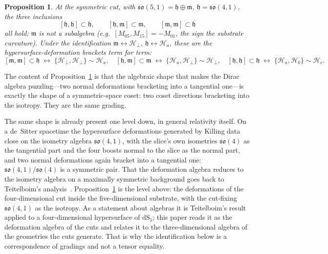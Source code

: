 \documentclass[11pt,a4paper]{article}
\theoremstyle{plain}
\newtheorem{proposition}{Proposition}
\theoremstyle{definition}
\theoremstyle{remark}
\newcommand{\so}{\mathfrak{so}}
\newcommand{\fh}{\mathfrak{h}}
\newcommand{\fm}{\mathfrak{m}}
\newcommand{\Hc}{\mathcal{H}}
\newcommand{\dS}{\mathrm{dS}}
\begin{document}
\begin{proposition}\label{prop:closure}
At the symmetric cut, with $\so(5,1)=\fh\oplus\fm$, $\fh=\so(4,1)$, the three inclusions
\[
[\fh,\fh]\subset\fh,\qquad [\fh,\fm]\subset\fm,\qquad [\fm,\fm]\subset\fh
\]
all hold; $\fm$ is not a subalgebra (e.g.\ $[M_{05},M_{15}]=-M_{01}$, the sign the substrate curvature). Under the identification $\fm\leftrightarrow\Hc_\perp$, $\fh\leftrightarrow\Hc_a$, these are the hypersurface-deformation brackets term for term:
\[
[\fm,\fm]\subset\fh \;\leftrightarrow\; \{\Hc_\perp,\Hc_\perp\}\sim\Hc_a,\quad
[\fh,\fm]\subset\fm \;\leftrightarrow\; \{\Hc_a,\Hc_\perp\}\sim\Hc_\perp,\quad
[\fh,\fh]\subset\fh \;\leftrightarrow\; \{\Hc_a,\Hc_b\}\sim\Hc_c.
\]
\end{proposition}

\noindent The content of Proposition~\ref{prop:closure} is that the algebraic shape that makes the Dirac algebra puzzling---two normal deformations bracketing into a tangential one---is exactly the shape of a symmetric-space coset: two coset directions bracketing into the isotropy. They are the same grading.

The same shape is already present one level down, in general relativity itself. On a de~Sitter spacetime the hypersurface deformations generated by Killing data close on the isometry algebra $\so(4,1)$, with the slice's own isometries $\so(4)$ as the tangential part and the four boosts normal to the slice as the normal part, and two normal deformations again bracket into a tangential one: $\so(4,1)/\so(4)$ is a symmetric pair. That the deformation algebra reduces to the isometry algebra on a maximally symmetric background goes back to Teitelboim's analysis~\cite{Teitelboim1973}. Proposition~\ref{prop:closure} is the level above: the deformations of the four-dimensional cut inside the five-dimensional substrate, with the cut-fixing $\so(4,1)$ as the isotropy. As a statement about algebras it is Teitelboim's result applied to a four-dimensional hypersurface of $\dS_5$; this paper reads it as the deformation algebra of the cuts and relates it to the three-dimensional algebra of the geometries the cuts generate. That is why the identification below is a correspondence of gradings and not a tensor equality.
\end{document}
